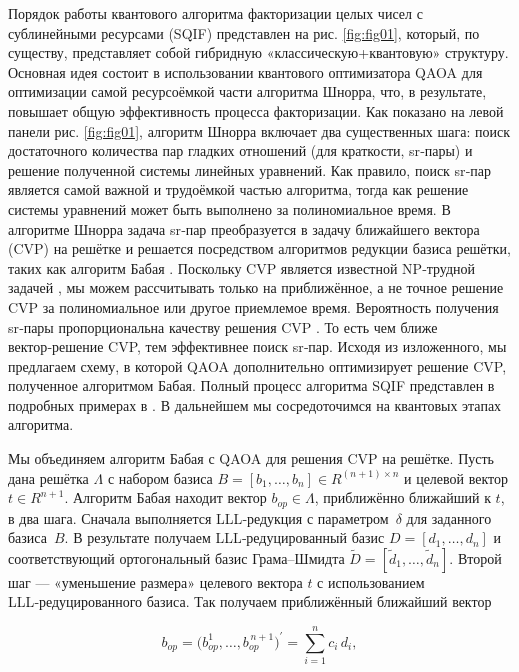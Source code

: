 Порядок работы квантового алгоритма факторизации целых чисел с сублинейными
ресурсами (SQIF) представлен на рис. \ref{fig:fig01}, который, по существу,
представляет собой гибридную «классическую+квантовую» структуру. Основная идея
состоит в использовании квантового оптимизатора QAOA для оптимизации самой
ресурсоёмкой части алгоритма Шнорра, что, в результате, повышает общую
эффективность процесса факторизации. Как показано на левой панели рис.
\ref{fig:fig01}, алгоритм Шнорра включает два существенных шага: поиск
достаточного количества пар гладких отношений (для краткости, sr‑пары) и
решение полученной системы линейных уравнений. Как правило, поиск sr‑пар
является самой важной и трудоёмкой частью алгоритма, тогда как решение системы
уравнений может быть выполнено за полиномиальное время. В алгоритме Шнорра
\cite{cite_31} задача sr‑пар преобразуется в задачу ближайшего вектора (CVP) на
решётке и решается посредством алгоритмов редукции базиса решётки, таких как
алгоритм Бабая \cite{cite_32}. Поскольку CVP является известной NP‑трудной
задачей \cite{cite_33}, мы можем рассчитывать только на приближённое, а не
точное решение CVP за полиномиальное или другое приемлемое время. Вероятность
получения sr‑пары пропорциональна качеству решения CVP \cite{cite_29}. То есть
чем ближе вектор‑решение CVP, тем эффективнее поиск sr‑пар. Исходя из
изложенного, мы предлагаем схему, в которой QAOA дополнительно оптимизирует
решение CVP, полученное алгоритмом Бабая. Полный процесс алгоритма SQIF
представлен в подробных примерах в \cite{cite_31}. В дальнейшем мы
сосредоточимся на квантовых этапах алгоритма.

Мы объединяем алгоритм Бабая с QAOA для решения CVP на решётке. Пусть дана
решётка $\Lambda$ с набором базиса $B=[b_1,\ldots,b_n]\in {R}^{(n+1)\times n}$
и целевой вектор ${t}\in{R}^{n+1}$. Алгоритм Бабая находит вектор
${b}_{{op}}\in\Lambda$, приближённо ближайший к ${t}$, в два шага. Сначала
выполняется LLL‑редукция с параметром~$\delta$ для заданного базиса~$B$. В
результате получаем LLL‑редуцированный базис $D=[d_1,\ldots,d_n]$ и
соответствующий ортогональный базис Грама–Шмидта
$\widetilde{D}=[\widetilde{d}_1,\ldots,\widetilde{d}_n]$. Второй шаг —
«уменьшение размера» целевого вектора ${t}$ с использованием
LLL‑редуцированного базиса. Так получаем приближённый ближайший вектор

\begin{equation}
    {b}_{{op}}
    = \bigl(b^{1}_{{op}},\ldots,b^{\,n+1}_{{op}}\bigr)^{\prime}
    = \sum_{i=1}^{n} c_{i}\,d_{i},
\end{equation}

